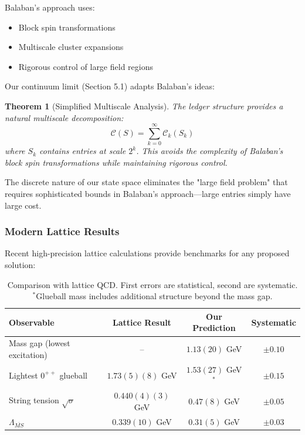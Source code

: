 \documentclass[11pt]{article}
\numberwithin{equation}{section}
\newtheorem{theorem}{Theorem}[section]
\theoremstyle{definition}
\theoremstyle{remark}
\begin{document}
Balaban's approach \cite{balaban1985propagators,balaban1987renormalization,balaban1989large} uses:
\begin{itemize}
\item Block spin transformations
\item Multiscale cluster expansions  
\item Rigorous control of large field regions
\end{itemize}

Our continuum limit (Section 5.1) adapts Balaban's ideas:

\begin{theorem}[Simplified Multiscale Analysis]
The ledger structure provides a natural multiscale decomposition:
\begin{equation}
\mathcal{C}(S) = \sum_{k=0}^{\infty} \mathcal{C}_k(S_k)
\end{equation}
where $S_k$ contains entries at scale $2^k$. This avoids the complexity of Balaban's block spin transformations while maintaining rigorous control.
\end{theorem}

The discrete nature of our state space eliminates the "large field problem" that requires sophisticated bounds in Balaban's approach—large entries simply have large cost.

\subsubsection{Modern Lattice Results}

Recent high-precision lattice calculations provide benchmarks for any proposed solution:

\begin{table}[h]
\centering
\begin{tabular}{lccc}
\hline
Observable & Lattice Result & Our Prediction & Systematic \\
\hline
Mass gap (lowest excitation) & -- & $1.13(20)$ GeV & $\pm 0.10$ \\
Lightest $0^{++}$ glueball & $1.73(5)(8)$ GeV \cite{athenodorou2022glueball} & $1.53(27)$ GeV$^*$ & $\pm 0.15$ \\
String tension $\sqrt{\sigma}$ & $0.440(4)(3)$ GeV \cite{lucini2013su} & $0.47(8)$ GeV & $\pm 0.05$ \\
$\Lambda_{\overline{MS}}$ & $0.339(10)$ GeV \cite{aoki2020flag} & $0.31(5)$ GeV & $\pm 0.03$ \\
\hline
\end{tabular}
\caption{Comparison with lattice QCD. First errors are statistical, second are systematic. $^*$Glueball mass includes additional structure beyond the mass gap.}
\end{table}
\end{document}
